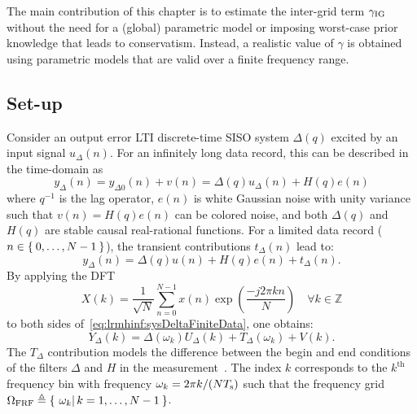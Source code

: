 The main contribution of this chapter is to  estimate the inter-grid term $\gamma_{\mathrm{IG}}$ without the need for a (global) parametric model or imposing worst-case prior knowledge that leads to conservatism.
Instead, a  realistic value of $\gamma$ is obtained using parametric models that are valid over a finite frequency range.

\subsection{Set-up}
Consider an output error \gls{LTI} discrete-time \gls{SISO} system $\Delta(q)$ excited by an input signal $u_{\Delta}(n)$.
For an infinitely long data record, this can be described in the time-domain as
\begin{equation}
  y_{\Delta}(n) 
    = 
      y_{\Delta0}(n)
      + v(n) 
    = 
      \Delta(q)u_{\Delta}(n) 
      + H(q)e(n)
  \label{eq:lrmhinf:sysDeltaInfData}
\end{equation}
where $q^{-1}$ is the lag operator, $e(n)$ is white Gaussian noise with unity variance such that $v(n) = H(q)e(n)$ can be colored noise, and both $\Delta(q)$ and $H(q)$ are stable causal real-rational functions.
For a limited data record ($n \in \Set{0,\ldots,N-1}$), the transient contributions $t_{\Delta}(n)$ lead to:
\begin{equation}
    y_{\Delta}(n) 
      = 
        \Delta(q)u(n) 
        + H(q)e(n) 
        + t_{\Delta}(n)
    \text{.}
    \label{eq:lrmhinf:sysDeltaFiniteData}
\end{equation}
By applying the \gls{DFT}
\begin{equation}
  X(k) 
       = 
         \frac{1}
              {\sqrt{N}} 
         \sum_{n=0}^{N-1} 
            x(n) \exp \left( \frac{- j 2 \pi k n }{N} \right)
         \quad   
         \forall k \in \mathbb{Z}
  \label{eq:lrmhinf:DFT}
\end{equation} 
to both sides of~\eqref{eq:lrmhinf:sysDeltaFiniteData}, one obtains:
\begin{equation}
  Y_{\Delta}(k) 
                = 
                  \Delta(\omega_k) U_{\Delta}(k) 
                  + T_{\Delta}(\omega_k) 
                  + V(k) 
  \text{.}
  \label{eq:lrmhinf:sysDeltaFiniteDataFD}
\end{equation}
The $T_{\Delta}$ contribution models the difference between the begin and end conditions of the filters $\Delta$ and $H$ in the measurement~\citep{Pintelon1997ARB}.
The index $k$ corresponds to the $k^{\text{th}}$ frequency bin with frequency $\omega_{k} = 2\pi k / (N T_{\mathrm{s}})$ such that the frequency grid $\Omega_{\mathrm{FRF}} \triangleq \Set{\left.\omega_k \right| k = 1,\ldots,N-1}$.

